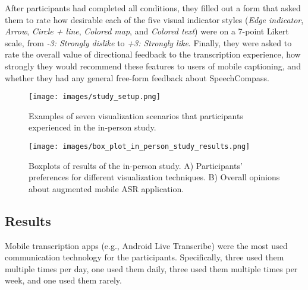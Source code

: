 After participants had completed all conditions, they filled out a form that asked them to rate how desirable each of the five visual indicator styles (\textit{Edge indicator}, \textit{Arrow}, \textit{Circle  + line}, \textit{Colored map}, and \textit{Colored text}) were on a 7-point Likert scale, from \emph{-3: Strongly dislike} to \emph{+3: Strongly like}. Finally, they were asked to rate the overall value of directional feedback to the transcription experience, how strongly they would recommend these features to users of mobile captioning, and whether they had any general free-form feedback about SpeechCompass. 

\begin{figure*}
  \centering
  \texttt{[image: images/study\_setup.png]}
  \caption{Examples of seven visualization scenarios that participants experienced in the in-person study.} 
  \label{fig:ui_options} 
\end{figure*}


\begin{figure*}
  \centering
  \texttt{[image: images/box\_plot\_in\_person\_study\_results.png]}
  \caption{Boxplots of results of the in-person study. A) Participants' preferences for different visualization techniques. B) Overall opinions about augmented mobile ASR application. } 
  \label{fig:user_preferences} 
\end{figure*}

\subsection{Results}
Mobile transcription apps (e.g., Android Live Transcribe) were the most used communication technology for the participants. Specifically, three used them multiple times per day, one used them daily, three used them multiple times per week, and one used them rarely. 

